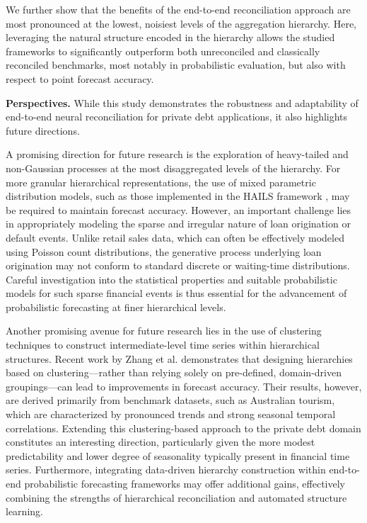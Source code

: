 \documentclass[letterpaper]{article}
\begin{document}
We further show that the benefits of the end-to-end reconciliation approach are most pronounced at the lowest, noisiest levels of the aggregation hierarchy. Here, leveraging the natural structure encoded in the hierarchy allows the studied frameworks to significantly outperform both unreconciled and classically reconciled benchmarks, most notably in probabilistic evaluation, but also with respect to point forecast accuracy.

\textbf{Perspectives.} While this study demonstrates the robustness and adaptability of end-to-end neural reconciliation for private debt applications, it also highlights future directions. 

A promising direction for future research is the exploration of heavy-tailed and non-Gaussian processes at the most disaggregated levels of the hierarchy. For more granular hierarchical representations, the use of mixed parametric distribution models, such as those implemented in the HAILS framework \cite{HAILS}, may be required to maintain forecast accuracy. However, an important challenge lies in appropriately modeling the sparse and irregular nature of loan origination or default events. Unlike retail sales data, which can often be effectively modeled using Poisson count distributions, the generative process underlying loan origination may not conform to standard discrete or waiting-time distributions. Careful investigation into the statistical properties and suitable probabilistic models for such sparse financial events is thus essential for the advancement of probabilistic forecasting at finer hierarchical levels.

Another promising avenue for future research lies in the use of clustering techniques to construct intermediate-level time series within hierarchical structures. Recent work by Zhang et al.\cite{cluster} demonstrates that designing hierarchies based on clustering—rather than relying solely on pre-defined, domain-driven groupings—can lead to improvements in forecast accuracy. Their results, however, are derived primarily from benchmark datasets, such as Australian tourism, which are characterized by pronounced trends and strong seasonal temporal correlations. Extending this clustering-based approach to the private debt domain constitutes an interesting direction, particularly given the more modest predictability and lower degree of seasonality typically present in financial time series. Furthermore, integrating data-driven hierarchy construction within end-to-end probabilistic forecasting frameworks may offer additional gains, effectively combining the strengths of hierarchical reconciliation and automated structure learning.
\end{document}
